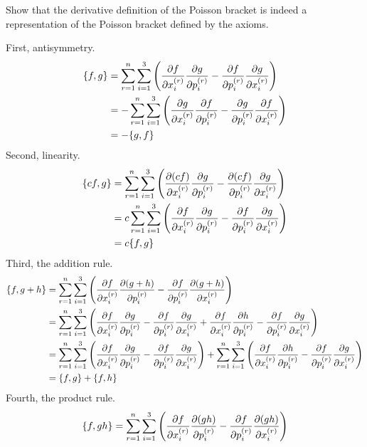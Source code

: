 \documentclass[boxes]{homework}
\makeatletter
\numberwithin{@problem}{section}
\makeatother
\begin{document}
\begin{problem}
Show that the derivative definition of the Poisson bracket is indeed a representation of the Poisson bracket defined by the axioms.
\end{problem}

\begin{solution}
	First, antisymmetry.
	\begin{align*}
		\pb{f}{g} & = \sum_{r=1}^{n} \sum_{i=1}^{3}\qty(\pdv{f}{x_{i}^{(r)}} \pdv{g}{p_{i}^{(r)}} - \pdv{f}{p_{i}^{(r)}} \pdv{g}{x_{i}^{(r)}}) \\
		          & = -\sum_{r=1}^{n} \sum_{i=1}^{3}\qty(\pdv{g}{x_{i}^{(r)}}\pdv{f}{p_{i}^{(r)}} - \pdv{g}{p_{i}^{(r)}}\pdv{f}{x_{i}^{(r)}})  \\
		          & = -\pb{g}{f}
	\end{align*}
	Second, linearity.
	\begin{align*}
		\pb{cf}{g} & = \sum_{r=1}^{n} \sum_{i=1}^{3}\qty(\pdv{(cf)}{x_{i}^{(r)}} \pdv{g}{p_{i}^{(r)}} - \pdv{(cf)}{p_{i}^{(r)}} \pdv{g}{x_{i}^{(r)}}) \\
		           & = c\sum_{r=1}^{n} \sum_{i=1}^{3}\qty(\pdv{f}{x_{i}^{(r)}} \pdv{g}{p_{i}^{(r)}} - \pdv{f}{p_{i}^{(r)}} \pdv{g}{x_{i}^{(r)}})      \\
		           & = c\pb{f}{g}
	\end{align*}
	Third, the addition rule.
	\begin{align*}
		\pb{f}{g + h} & = \sum_{r=1}^{n} \sum_{i=1}^{3}\qty(\pdv{f}{x_{i}^{(r)}} \pdv{(g + h)}{p_{i}^{(r)}} - \pdv{f}{p_{i}^{(r)}} \pdv{(g + h)}{x_{i}^{(r)}})                                                                                                                \\
		              & = \sum_{r=1}^{n} \sum_{i=1}^{3}\qty(\pdv{f}{x_{i}^{(r)}} \pdv{g}{p_{i}^{(r)}} - \pdv{f}{p_{i}^{(r)}} \pdv{g}{x_{i}^{(r)}} + \pdv{f}{x_{i}^{(r)}} \pdv{h}{p_{i}^{(r)}} - \pdv{f}{p_{i}^{(r)}} \pdv{g}{x_{i}^{(r)}})                                    \\
		              & = \sum_{r=1}^{n} \sum_{i=1}^{3}\qty(\pdv{f}{x_{i}^{(r)}} \pdv{g}{p_{i}^{(r)}} - \pdv{f}{p_{i}^{(r)}} \pdv{g}{x_{i}^{(r)}}) + \sum_{r=1}^{n} \sum_{i=1}^{3}\qty(\pdv{f}{x_{i}^{(r)}} \pdv{h}{p_{i}^{(r)}} - \pdv{f}{p_{i}^{(r)}} \pdv{g}{x_{i}^{(r)}}) \\
		              & = \pb{f}{g} + \pb{f}{h}
	\end{align*}
	Fourth, the product rule.
	\begin{align*}
		\pb{f}{gh} & = \sum_{r=1}^{n} \sum_{i=1}^{3}\qty(\pdv{f}{x_{i}^{(r)}} \pdv{(gh)}{p_{i}^{(r)}} - \pdv{f}{p_{i}^{(r)}} \pdv{(gh)}{x_{i}^{(r)}})                                                       \\

\end{align*}
\end{solution}
\end{document}
